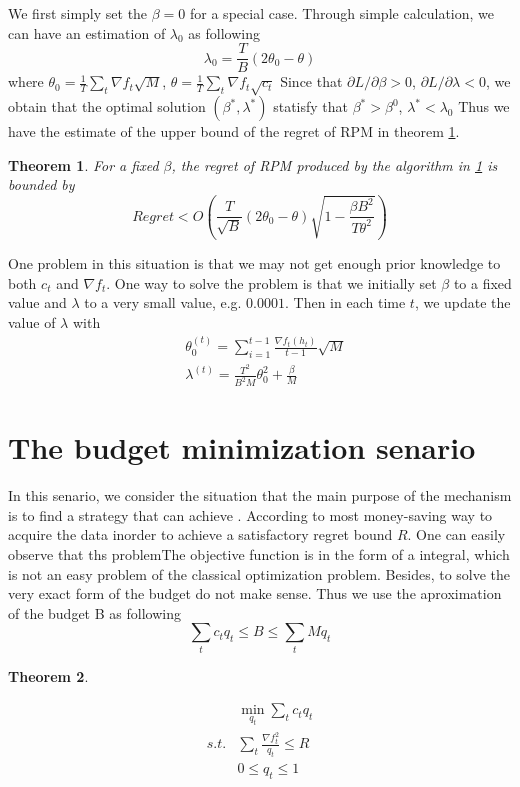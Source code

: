 \documentclass[10pt,conference,compsocconf,letterpaper]{IEEEtran}
\newtheorem{theorem}{Theorem}
\begin{document}
 We first simply set the $\beta=0$ for a special case. Through simple calculation, we can have an estimation of $\lambda_0$ as following
\begin{equation}
\lambda_0=\frac{T}{B}(2\theta_0-\theta)
\end{equation}
where $\theta_0=\frac{1}{T}\sum_t \nabla f_t\sqrt{M}$, $\theta=\frac{1}{T}\sum_t \nabla f_t\sqrt{c_t}$
Since that $\partial L/\partial \beta >0$, $\partial L/\partial \lambda <0$, we obtain that the optimal solution $(\beta^*,\lambda^*)$ statisfy that $\beta^*>\beta^0$, $\lambda^*<\lambda_0$ Thus we have the estimate of the upper bound of the regret of RPM in theorem \ref{thm:reg-bnd}.
\begin{theorem}\label{thm:reg-bnd}
For a fixed $\beta$, the regret of RPM produced by the algorithm in \ref{} is bounded by
\begin{equation}
Regret<O(\frac{T}{\sqrt{B}}(2\theta_0-\theta)\sqrt{1-\frac{\beta B^2}{T\theta^2}})
\end{equation}

\end{theorem}
\begin{IEEEproof}

\end{IEEEproof}
One problem in this situation is that we may not get enough prior knowledge to both $c_t$ and $\nabla f_t$. One way to solve the problem is that we initially set $\beta$ to a fixed value and $\lambda$ to a very small value, e.g. $0.0001$.  Then in each time $t$, we update the value of $\lambda$ with 
\begin{align}
&\theta_0^{(t)}=\sum_{i=1}^{t-1}\frac{\nabla f_t(h_t)}{t-1}\sqrt{M}\\
&\lambda^{(t)}=\frac{T^2}{B^2M}\theta_0^2+\frac{\beta}{M}
\end{align}


\section{The budget minimization senario}
In this senario, we consider the situation that the main purpose of the mechanism is to find a strategy that can achieve  . According to most money-saving way to acquire the data inorder to achieve a satisfactory regret bound $R$. One can easily observe that ths problemThe objective function is in the form of a integral, which is not an easy problem of the classical optimization problem. Besides, to solve the very exact form of the budget do not make sense. Thus we use the aproximation of the budget B as following
\begin{equation}
\sum_t c_t q_t \leq B \leq \sum_t Mq_t
\end{equation}
\begin{theorem}
\end{theorem}
\begin{equation}
\begin{aligned}
&\min_{q_t} \sum_tc_tq_t\\
s.t. &\sum_t \frac{\nabla f_t^2}{q_t}\leq R\\
	&0\leq q_t \leq 1
\end{aligned}
\end{equation}
\end{document}
